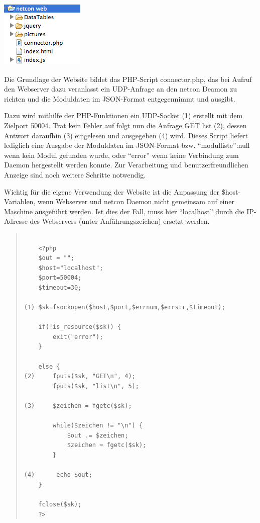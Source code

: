 \documentclass[a4paper,14pt,headsepline]{scrartcl}
\begin{document}
\newpage

\begin{center}
\includegraphics[width=0.20 \paperwidth]{./bilder/website_aufbau.png}
\end{center}

Die Grundlage der Website bildet das PHP-Script connector.php, das bei Aufruf den Webserver dazu veranlasst ein UDP-Anfrage an den netcon Deamon zu richten und die Moduldaten im JSON-Format entgegennimmt und ausgibt. 

Dazu wird mithilfe der PHP-Funktionen ein UDP-Socket (1) erstellt mit dem Zielport 50004. Trat kein Fehler auf folgt nun die Anfrage GET list (2), dessen Antwort daraufhin (3) eingelesen und ausgegeben (4) wird. Dieses Script liefert lediglich eine Ausgabe der Moduldaten im JSON-Format bzw. {``modulliste'':null} wenn kein Modul gefunden wurde, oder ``error'' wenn keine Verbindung zum Daemon hergestellt werden konnte. Zur Verarbeitung und benutzerfreundlichen Anzeige sind noch weitere Schritte notwendig.  

Wichtig für die eigene Verwendung der Website ist die Anpassung der \$host-Variablen, wenn Webserver und netcon Daemon nicht gemeinsam auf einer Maschine ausgeführt werden. Ist dies der Fall, muss hier ``localhost'' durch die IP-Adresse des Webservers (unter Anführungszeichen) ersetzt werden.  

\newpage

\begin{quote}
\begin{verbatim}

    <?php
    $out = "";
    $host="localhost";
    $port=50004;
    $timeout=30;

(1) $sk=fsockopen($host,$port,$errnum,$errstr,$timeout);

    if(!is_resource($sk)) {				
        exit("error");		
    }

    else {					
(2)     fputs($sk, "GET\n", 4);
        fputs($sk, "list\n", 5);
        					
(3)     $zeichen = fgetc($sk);
    				
        while($zeichen != "\n") {
            $out .= $zeichen;
            $zeichen = fgetc($sk);
        }	
    				
(4)      echo $out;					
    }	
		
    fclose($sk);	
    ?>

\end{verbatim}
\end{quote} 
\end{document}
